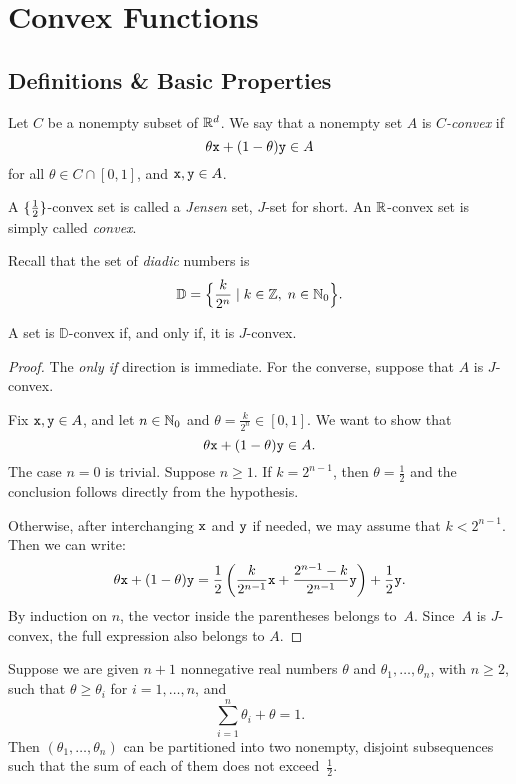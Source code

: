\chapter{Convex Functions}

\newcommand{\DD}{\mathbb{D}}
\section{Definitions \& Basic Properties}


Let $C$ be a nonempty subset of $\mathbb{R}^d$. We say that a nonempty set $A$ is \textsl{$C$-convex\/} if
$$
    \theta\mathtt x+(1-\theta)\mathtt y\in A
$$
for all $\theta\in C\cap[0,1]$, and $\mathtt x,\mathtt y\in A$.


A $\{\frac12\}$-convex set is called a \textsl{Jensen} set, $J$-set for short. An $\mathbb{R}$-convex set is simply called \textsl{convex}.

Recall that the set of \textsl{diadic} numbers is
$$
    \DD = \Big\{\frac k{2^n}\mid k\in\Z,\; n\in\N_0\Big\}.
$$

\begin{lem}
    A set is $\DD$-convex if, and only if, it is $J$-convex.
\end{lem}

\begin{proof}
    The \textit{only if} direction is immediate. For the converse, suppose that $A$ is $J$-convex.
    
    Fix $\mathtt x, \mathtt y \in A$, and let $n \in \mathbb{N}_0$ and $\theta = \frac{k}{2^n} \in [0,1]$. We want to show that
    \[
        \theta\mathtt x + (1-\theta)\mathtt y \in A.
    \]
    The case $n = 0$ is trivial. Suppose $n \ge 1$. If $k = 2^{n-1}$, then $\theta = \frac{1}{2}$ and the conclusion follows directly from the hypothesis.
    
    Otherwise, after interchanging $\mathtt x$ and $\mathtt y$ if needed, we may assume that $k < 2^{n-1}$. Then we can write:
    \[
        \theta\mathtt x + (1-\theta)\mathtt y
            = \frac{1}{2} \left( \frac{k}{2^{n-1}} \mathtt x
            + \frac{2^{n-1}-k}{2^{n-1}} \mathtt y \right)
            + \frac{1}{2} \mathtt y.
    \]
    By induction on $n$, the vector inside the parentheses belongs to~$A$. Since~$A$ is $J$-convex, the full expression also belongs to $A$.
\end{proof}

\begin{lem}
    Suppose we are given\/ $n+1$ nonnegative real numbers\/ $\theta$ and $\theta_1,\dots,\theta_n$, with\/ $n \ge 2$, such that\/ $\theta\ge\theta_i$\/ for $i=1,\dots,n$, and
    \[
        \sum_{i=1}^n \theta_i + \theta = 1.
    \]
    Then\/ $(\theta_1,\dots,\theta_n)$ can be partitioned into two nonempty, disjoint subsequences such that the sum of each of them does not exceed\/~$\frac{1}{2}$.
\end{lem}


